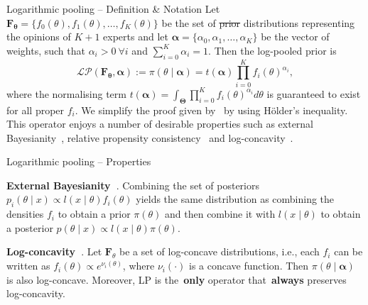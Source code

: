 \begin{frame}{Logarithmic pooling -- Definition \& Notation}
Let $\mathbf{F_\theta} = \{f_0(\theta), f_1(\theta), \ldots, f_K(\theta)\}$ be the set of \sout{prior} distributions representing the opinions of $K+1$ experts and let $\boldsymbol\alpha =\{\alpha_0, \alpha_1, \ldots, \alpha_K \}$ be the vector of weights, such that $\alpha_i > 0\: \forall i$ and $\sum_{i=0}^K \alpha_i = 1$.
Then the log-pooled prior is
\begin{equation}
\label{eq:logpool}
 \mathcal{LP}(\mathbf{F_\theta}, \boldsymbol\alpha) := \pi(\theta \mid \boldsymbol\alpha) = t(\boldsymbol\alpha) \prod_{i=0}^K f_i(\theta)^{\alpha_i}, 
\end{equation}
where the normalising term $t(\boldsymbol\alpha) = \int_{\boldsymbol\Theta}\prod_{i=0}^K f_i(\theta)^{\alpha_i}d\theta$ is guaranteed to exist for all proper $f_i$.
We simplify the proof given by~\cite{genest1986A} by using H\"{o}lder's inequality.
This operator enjoys a number of desirable properties such as external Bayesianity~\citep{genest1986A}, relative propensity consistency~\citep{genest1984} and log-concavity~\citep{Carvalho2021}.
\end{frame}
\begin{frame}{Logarithmic pooling -- Properties}
\begin{property}
\label{prp:EB}
 \textbf{External Bayesianity~\citep{genest1984}}. Combining the set of posteriors $p_i(\theta \mid x) \propto  l(x \mid \theta)f_i(\theta) $ yields the same distribution as combining the densities $f_i$ to obtain a prior $\pi(\theta)$ and then combine it with $l(x \mid \theta)$ to obtain a posterior $p(\theta \mid x) \propto l(x \mid \theta)\pi(\theta)$.
\end{property}

\begin{property}
\label{prp:concavity}
\textbf{Log-concavity~\citep{Carvalho2021}}. 
 Let $\mathbf{F}_{\theta}$ be a set of log-concave distributions, i.e., each $f_i$ can be written as $ f_i(\theta) \propto e^{\nu_i(\theta)}$, where $\nu_i(\cdot)$ is a concave function.
Then $\pi(\theta\mid \boldsymbol \alpha)$ is also log-concave.
Moreover, LP is the~\textbf{only} operator that~\textbf{always} preserves log-concavity.
\end{property}
\end{frame}
